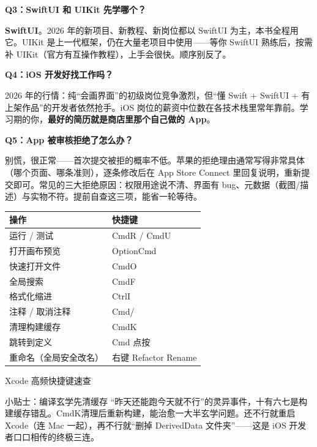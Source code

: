 \textbf{Q3：SwiftUI 和 UIKit 先学哪个？}

\textbf{SwiftUI}。2026 年的新项目、新教程、新岗位都以 SwiftUI 为主，本书全程用它。UIKit 是上一代框架，仍在大量老项目中使用——等你 SwiftUI 熟练后，按需补 UIKit（官方有互操作教程），上手会很快。顺序别反了。

\textbf{Q4：iOS 开发好找工作吗？}

2026 年的行情：纯“会画界面”的初级岗位竞争激烈，但“懂 Swift + SwiftUI + 有上架作品”的开发者依然抢手。iOS 岗位的薪资中位数在各技术栈里常年靠前。学习期的你，\textbf{最好的简历就是商店里那个自己做的 App}。

\textbf{Q5：App 被审核拒绝了怎么办？}

别慌，很正常——首次提交被拒的概率不低。苹果的拒绝理由通常写得非常具体（哪个页面、哪条准则），逐条修改后在 App Store Connect 里回复说明，重新提交即可。常见的三大拒绝原因：权限用途说不清、界面有 bug、元数据（截图/描述）与实物不符。提前自查这三项，能省一轮等待。


\begin{center}
\begin{tabularx}{\linewidth}{|X|X|}
\hline
\textbf{操作} & \textbf{快捷键} \tabularnewline
\hline
运行 / 测试 & CmdR / CmdU \tabularnewline
打开画布预览 & OptionCmd \tabularnewline
快速打开文件 & CmdO \tabularnewline
全局搜索 & CmdF \tabularnewline
格式化缩进 & CtrlI \tabularnewline
注释 / 取消注释 & Cmd/ \tabularnewline
清理构建缓存 & CmdK \tabularnewline
跳转到定义 & Cmd 点按 \tabularnewline
重命名（全局安全改名） & 右键 Refactor Rename \tabularnewline
\hline
\end{tabularx}
\end{center}

\begin{center}\small\color{gray}Xcode 高频快捷键速查\end{center}

\begin{tcbinfo}{小贴士：编译玄学先清缓存}
“昨天还能跑今天就不行”的灵异事件，十有六七是构建缓存错乱。CmdK清理后重新构建，能治愈一大半玄学问题。还不行就重启 Xcode（连 Mac 一起），再不行就“删掉 DerivedData 文件夹”——这是 iOS 开发者口口相传的终极三连。

\end{tcbinfo}


